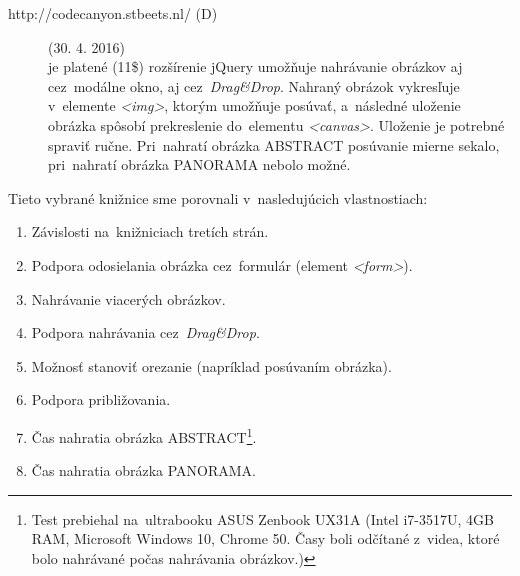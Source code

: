 \begin{description}
	
	\item[http://codecanyon.stbeets.nl/ (D)](30. 4. 2016)\\
	je platené (11\$) rozšírenie jQuery umožňuje nahrávanie obrázkov aj cez~modálne okno, aj cez~\emph{Drag\&Drop}. Nahraný obrázok vykresľuje v~elemente \emph{<img>}, ktorým umožňuje posúvať, a~následné uloženie obrázka spôsobí prekreslenie do~elementu \emph{<canvas>}. Uloženie je potrebné spraviť ručne. Pri~nahratí obrázka ABSTRACT posúvanie mierne sekalo, pri~nahratí obrázka PANORAMA nebolo možné.

\end{description}

Tieto vybrané knižnice sme porovnali v~nasledujúcich vlastnostiach:
\begin{enumerate}
	\item Závislosti na~knižniciach tretích strán.
	\item Podpora odosielania obrázka cez~formulár (element \emph{<form>}).
	\item Nahrávanie viacerých obrázkov.
	\item Podpora nahrávania cez~\emph{Drag\&Drop}.
	\item Možnosť stanoviť orezanie (napríklad posúvaním obrázka).
	\item Podpora približovania.
	\item Čas nahratia obrázka ABSTRACT\footnote{Test prebiehal na~ultrabooku ASUS Zenbook UX31A (Intel i7-3517U, 4GB RAM, Microsoft Windows 10, Chrome 50. Časy boli odčítané z~videa, ktoré bolo nahrávané počas nahrávania obrázkov.) }.
	\item Čas nahratia obrázka PANORAMA\footnotemark[\value{footnote}].
\end{enumerate}

